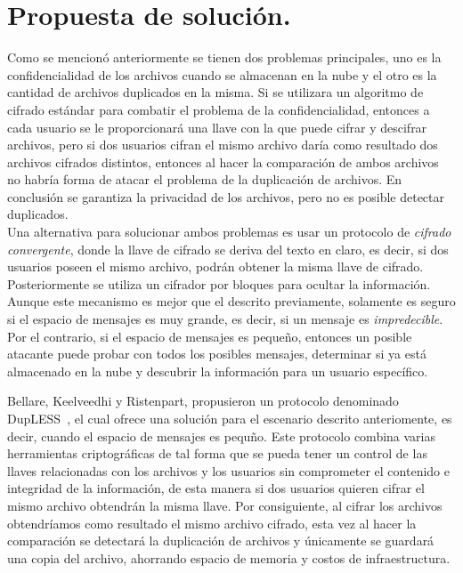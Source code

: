 
\section{Propuesta de solución. }

Como se mencionó anteriormente se tienen dos problemas principales, uno es la confidencialidad de los archivos cuando se almacenan en la nube y el otro es la cantidad de archivos duplicados en la misma. Si se utilizara un algoritmo de cifrado est\'andar para combatir el problema de la confidencialidad, entonces a cada usuario se le proporcionará una llave con la que puede cifrar y descifrar archivos, pero si dos usuarios cifran el mismo archivo daría como resultado dos archivos cifrados distintos, entonces al hacer la comparación de ambos archivos no habría forma de atacar el problema de la duplicación de archivos. En conclusi\'on se garantiza la privacidad de los archivos, pero no es posible detectar duplicados.\\

Una alternativa para solucionar ambos problemas es usar un protocolo de {\it cifrado convergente}, donde la llave de cifrado se deriva del texto en claro, es decir, si dos usuarios poseen el mismo archivo, podr\'an obtener la misma llave de cifrado. Posteriormente se utiliza un cifrador por bloques para ocultar la informaci\'on. Aunque este mecanismo es mejor que el descrito previamente, solamente es seguro si el espacio de mensajes es muy grande, es decir, si un mensaje es {\it impredecible}. Por el contrario, si el espacio de mensajes es peque\~no, entonces un posible atacante puede probar con todos los posibles mensajes, determinar si ya est\'a almacenado en la nube y descubrir la 
informaci\'on para un usuario espec\'ifico. 

Bellare, Keelveedhi y Ristenpart, propusieron un protocolo denominado DupLESS~\cite{Bellare}, el cual ofrece una soluci\'on para el escenario descrito anteriomente, es decir, cuando el espacio de mensajes es pequ\~no. Este protocolo combina varias herramientas criptográficas de tal forma que se pueda tener un control de las llaves relacionadas con los archivos y los usuarios sin comprometer el contenido e integridad de la información, de esta manera si dos usuarios quieren cifrar el mismo archivo obtendrán la misma llave. Por consiguiente, al cifrar los archivos obtendríamos como resultado el mismo archivo cifrado, esta vez al hacer la comparación se detectará la duplicación de archivos y únicamente se guardará una copia del archivo, ahorrando espacio de memoria y costos de infraestructura. \\

